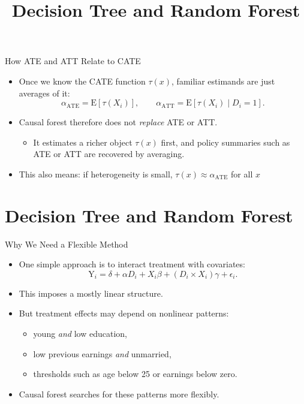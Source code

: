 \documentclass[hyperref={pdfpagelabels=false}]{beamer}
\begin{document}
\begin{frame}{How ATE and ATT Relate to CATE}
\begin{itemize}
  \item Once we know the CATE function $\tau(x)$, familiar estimands are just averages of it:
  \[
    \alpha_{\text{ATE}} = \mathrm{E}\!\left[\tau(X_i)\right], \qquad
    \alpha_{\text{ATT}} = \mathrm{E}\!\left[\tau(X_i)\mid D_i=1\right].
  \]
  \vspace{0.2cm}
  \item Causal forest therefore does not \emph{replace} ATE or ATT.
  \vspace{0.1cm}
  \begin{itemize}
    \item It estimates a richer object $\tau(x)$ first, and policy summaries such as ATE or ATT are recovered by averaging.
  \end{itemize}
  \vspace{0.2cm}
  \item This also means: if heterogeneity is small, $\tau(x) \approx \alpha_{\text{ATE}}$ for all $x$ 

\end{itemize}
\end{frame}

\title[]
{Decision Tree and Random Forest}

\subtitle{}
\author{}
\institute{}
\date{}

\begin{frame}{}
  \titlepage
\end{frame}

\section{Decision Tree and Random Forest}

\begin{frame}{Why We Need a Flexible Method}
\begin{itemize}
  \item One simple approach is to interact treatment with covariates:
  \[
    \mathrm{Y}_i
    =
    \delta+\alpha D_i+X_i\beta+(D_i\times X_i)\gamma+\epsilon_i.
  \]
  \vspace{0.2cm}
  \item This imposes a mostly linear structure.
  \vspace{0.2cm}
  \item But treatment effects may depend on nonlinear patterns:
  \begin{itemize}
    \item young \textit{and} low education,
    \item low previous earnings \textit{and} unmarried,
    \item thresholds such as age below 25 or earnings below zero.
  \end{itemize}
  \vspace{0.2cm}
  \item Causal forest searches for these patterns more flexibly.
\end{itemize}
\end{frame}
\end{document}
